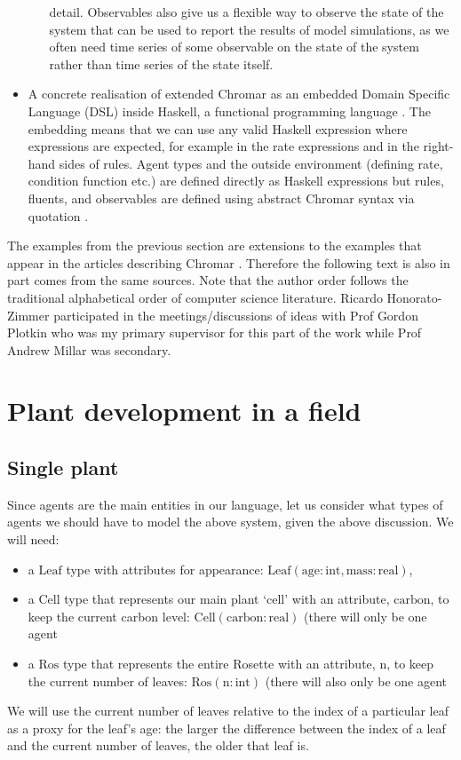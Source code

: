 \begin{itemize}
\begin{itemize}
    detail. Observables also give us a flexible way to observe the state of the
    system that can be used to report the results of model simulations, as we
    often need time series of some observable on the state of the system rather
    than time series of the state itself.
\end{itemize}
\item A concrete realisation of extended Chromar as an embedded Domain Specific
  Language (DSL) inside Haskell, a functional programming language
  \citep{gibbons_functional_2015}. The embedding means that we can use any valid
  Haskell expression where expressions are expected, for example in the rate
  expressions and in the right-hand sides of rules. Agent types and the outside
  environment (defining rate, condition function etc.) are defined directly as
  Haskell expressions but rules, fluents, and observables are defined using
  abstract Chromar syntax via quotation \citep{mainland_why_2007}.
\end{itemize}

The examples from the previous section are extensions to the examples that
appear in the articles describing Chromar \citep{honorato-zimmer_chromar_2017,
  honorato-zimmer_chromar_2018}. Therefore the following text is also in part
comes from the same sources. Note that the author order follows the traditional
alphabetical order of computer science literature. Ricardo Honorato-Zimmer
participated in the meetings/discussions of ideas with Prof Gordon Plotkin who
was my primary supervisor for this part of the work while Prof Andrew Millar was
secondary.


\section{Plant development in a field}
\label{sec:plantDev}

\subsection{Single plant}
Since agents are the main entities in our language, let us
consider what types of agents we should have to model the above
system, given the above discussion. We will need:
\begin{itemize}
\item a $\mathrm{Leaf}$ type with attributes for 
appearance: $\mathrm{Leaf}(\mathrm{age}:\mathrm{int},
\mathrm{mass}:\mathrm{real})$,
\item a $\mathrm{Cell}$ type that represents our main plant `cell' with an
attribute, $\mathrm{carbon}$, to keep the current carbon level:
$\mathrm{Cell}(\mathrm{carbon}:\mathrm{real})$ (there will only be one agent
\item a $\mathrm{Ros}$ type that represents the entire Rosette with an
attribute, $\mathrm{n}$, to keep the current number of leaves:
$\mathrm{Ros}(\mathrm{n}:\mathrm{int})$ (there will also only be one agent
\end{itemize}
We will use the current number of leaves relative to the index of
a particular leaf as a proxy for the leaf's age: the larger the difference
between the index of a leaf and the current number of leaves, the older that
leaf is.

